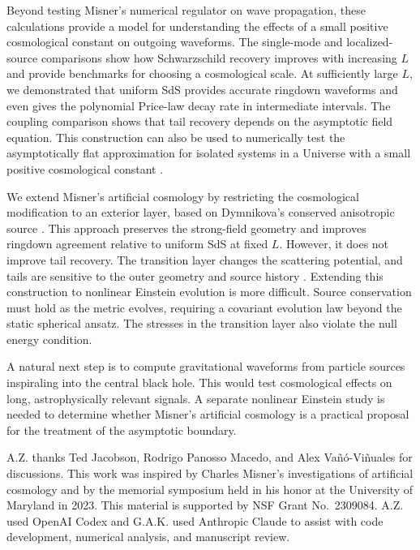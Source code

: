 \documentclass[
 aps,
 prd,
 reprint,
 superscriptaddress,
 nofootinbib,
 longbibliography
]{revtex4-2}
\begin{document}
Beyond testing Misner's numerical regulator on wave propagation, these calculations provide a model for understanding the effects of a small positive cosmological constant on outgoing waveforms.  The single-mode and localized-source comparisons show how Schwarzschild recovery improves with increasing $L$ and provide benchmarks for choosing a cosmological scale.  At sufficiently large $L$, we demonstrated that uniform SdS provides accurate ringdown waveforms and even gives the polynomial Price-law decay rate in intermediate intervals. The coupling comparison shows that tail recovery depends on
the asymptotic field equation.
This construction can also be used to numerically test the asymptotically flat approximation for isolated systems in a Universe with a small positive cosmological constant
\cite{Ashtekar:2014zfa,Ashtekar:2015lxa}.


We extend Misner's artificial cosmology by restricting the cosmological modification to an exterior layer, based on Dymnikova's conserved anisotropic source \cite{Dymnikova:2000algebraic,Dymnikova:2002mass}. This approach preserves the strong-field geometry and improves ringdown agreement relative to uniform SdS at fixed $L$.
However, it does not improve tail recovery.
The transition layer changes the scattering potential, and tails are sensitive to the outer geometry and source history
\cite{DeAmicisEtAl:2024tails,RosatoEtAl:2026GreenFunction}.
Extending this construction to nonlinear Einstein evolution is more
difficult.  Source conservation must hold as the metric evolves, requiring
a covariant evolution law beyond the static spherical ansatz.  The stresses in the transition layer also violate the null energy condition.

A natural next step is to compute gravitational waveforms from particle
sources inspiraling into the central black hole.  This would test
cosmological effects on long, astrophysically relevant signals.  A separate
nonlinear Einstein study is needed to determine whether Misner's artificial cosmology
is a practical proposal for the treatment of the asymptotic boundary.

\begin{acknowledgments}
A.Z. thanks Ted Jacobson, Rodrigo Panosso Macedo, and Alex
Va\~n\'o-Vi\~nuales for discussions.  This work was inspired by Charles
Misner's investigations of artificial cosmology and by the memorial
symposium held in his honor at the University of Maryland in 2023.  This material is
supported by NSF Grant No.~2309084. A.Z. used OpenAI Codex and G.A.K. used Anthropic Claude to assist with code
development, numerical analysis, and manuscript review.
\end{acknowledgments}
\end{document}
